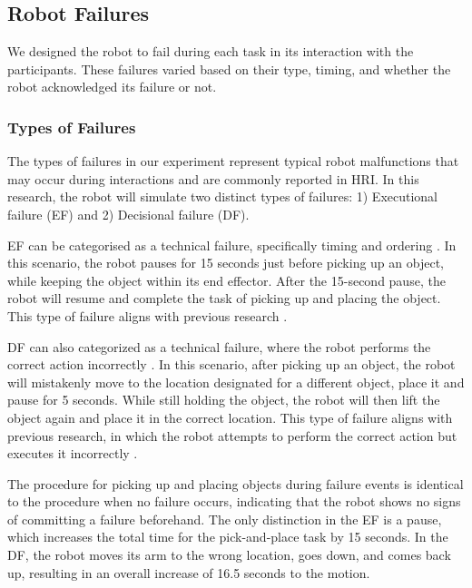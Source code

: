 
\subsection{Robot Failures}
We designed the robot to fail during each task in its interaction with the participants. These failures varied based on their type, timing, and whether the robot acknowledged its failure or not.

\subsubsection{\textbf{Types of Failures}}

The types of failures in our experiment represent typical robot malfunctions that may occur during interactions and are commonly reported in HRI. In this research, the robot will simulate two distinct types of failures: 1) Executional failure (EF) and 2) Decisional failure (DF).

EF can be categorised as a technical failure, specifically timing and ordering \cite{honig_understanding_2018}. In this scenario, the robot pauses for 15 seconds just before picking up an object, while keeping the object within its end effector. After the 15-second pause, the robot will resume and complete the task of picking up and placing the object. This type of failure aligns with previous research \cite{kontogiorgos_embodiment_2020, wachowiak_analysing_2022}.

DF can also categorized as a technical failure, where the robot performs the correct action incorrectly \cite{honig_understanding_2018}. In this scenario, after picking up an object, the robot will mistakenly move to the location designated for a different object, place it and pause for 5 seconds. While still holding the object, the robot will then lift the object again and place it in the correct location. This type of failure aligns with previous research, in which the robot attempts to perform the correct action but executes it incorrectly \cite{inceoglu_fino-net_2021, stiber_using_2023}.


The procedure for picking up and placing objects during failure events is identical to the procedure when no failure occurs, indicating that the robot shows no signs of committing a failure beforehand. The only distinction in the EF is a pause, which increases the total time for the pick-and-place task by 15 seconds. In the DF, the robot moves its arm to the wrong location, goes down, and comes back up, resulting in an overall increase of 16.5 seconds to the motion.


